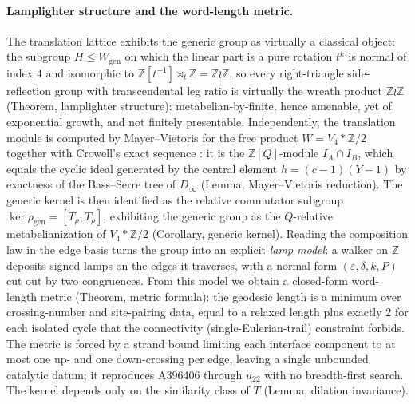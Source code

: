 \documentclass[11pt]{article}
\theoremstyle{plain}
\theoremstyle{definition}
\theoremstyle{remark}
\newcommand{\Z}{\mathbb{Z}}
\begin{document}
\paragraph{Lamplighter structure and the word-length metric.}
The translation lattice exhibits the generic group as virtually a
classical object: the subgroup $H\le W_{\mathrm{gen}}$ on which the
linear part is a pure rotation $t^k$ is normal of index $4$ and
isomorphic to $\Z[t^{\pm1}]\rtimes_t\Z=\Z\wr\Z$, so every
right-triangle side-reflection group with transcendental leg ratio is
virtually the wreath product $\Z\wr\Z$ (Theorem, lamplighter
structure): metabelian-by-finite, hence amenable, yet of exponential
growth, and not finitely presentable. Independently, the translation
module is computed by Mayer--Vietoris for the free product
$W=V_4*\Z/2$ together with Crowell's exact sequence \cite{Crowell}: it is the
$\Z[Q]$-module $I_A\cap I_B$, which equals the cyclic ideal generated
by the central element $h=(c-1)(Y-1)$ by exactness of the Bass--Serre
tree of $D_\infty$ \cite{Serre} (Lemma, Mayer--Vietoris reduction). The generic
kernel is then identified as the relative commutator subgroup
$\ker\rho_{\mathrm{gen}}=[T_\rho,T_\rho]$, exhibiting the generic group
as the $Q$-relative metabelianization of $V_4*\Z/2$
(Corollary, generic kernel). Reading the composition law in the edge
basis turns the group into an explicit \emph{lamp model}: a walker on
$\Z$ deposits signed lamps on the edges it traverses, with a normal
form $(\varepsilon,\delta,k,P)$ cut out by two congruences. From this
model we obtain a closed-form word-length metric (Theorem, metric
formula): the geodesic length is a minimum over crossing-number and
site-pairing data, equal to a relaxed length plus exactly $2$ for each
isolated cycle that the connectivity (single-Eulerian-trail) constraint
forbids. The metric is forced by a strand bound limiting each interface
component to at most one up- and one down-crossing per edge, leaving a
single unbounded catalytic datum; it reproduces A396406 through $u_{22}$
with no breadth-first search. The kernel depends only on the similarity
class of $T$ (Lemma, dilation invariance).
\end{document}
